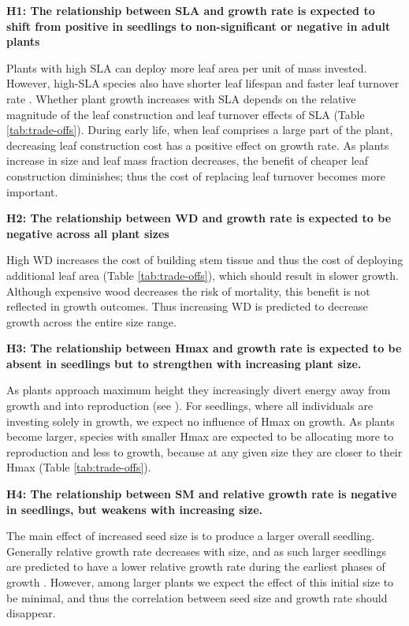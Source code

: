 \documentclass[a4paper,11pt]{article}
\begin{document}
\textbf{H1: The relationship between SLA and growth rate is expected to shift from positive in seedlings to non-significant or negative in adult plants}

Plants with high SLA can deploy more leaf area per unit of mass invested. However, high-SLA species also have shorter leaf lifespan and faster leaf turnover rate \citep{Wright:2004jb}. Whether plant growth increases with SLA depends on the relative magnitude of the leaf construction and leaf turnover effects of SLA (Table \ref{tab:trade-offs}). During early life, when leaf comprises a large part of the plant, decreasing leaf construction cost has a positive effect on growth rate. As plants increase in size and leaf mass fraction decreases, the benefit of cheaper leaf construction diminishes; thus the cost of replacing leaf turnover becomes more important.

\textbf{H2: The relationship between WD and growth rate is expected to be negative across all plant sizes}

High WD increases the cost of building stem tissue and thus the cost of deploying additional leaf area (Table \ref{tab:trade-offs}), which should result in slower growth. Although expensive wood decreases the risk of mortality, this benefit is not reflected in growth outcomes. Thus increasing WD is predicted to decrease growth across the entire size range.

\textbf{H3: The relationship between Hmax and growth rate is expected to be absent in seedlings but to strengthen with increasing plant size.}

As plants approach maximum height they increasingly divert energy away from growth and into reproduction (see \citealt{Thomas:1996do,Thomas-2011, Wenk:2014jz}). For seedlings, where all individuals are investing solely in growth, we expect no influence of Hmax on growth. As plants become larger, species with smaller Hmax are expected to be allocating more to reproduction and less to growth, because at any given size they are closer to their Hmax (Table \ref{tab:trade-offs}).

\textbf{H4: The relationship between SM and relative growth rate is negative in seedlings, but weakens with increasing size.}

The main effect of increased seed size is to produce a larger overall seedling. Generally relative growth rate decreases with size, and as such larger seedlings are predicted to have a lower relative growth rate during the earliest phases of growth \citep{Turnbull:2012ew}. However, among larger plants we expect the effect of this initial size to be minimal, and thus the correlation between seed size and growth rate should disappear.
\end{document}
